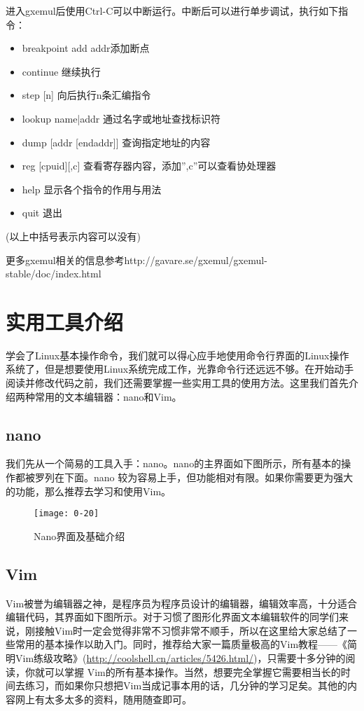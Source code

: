 进入gxemul后使用Ctrl-C可以中断运行。中断后可以进行单步调试，执行如下指令：
\begin{itemize}
\item breakpoint add addr添加断点
\item continue 继续执行
\item step [n] 向后执行n条汇编指令
\item lookup name|addr 通过名字或地址查找标识符
\item dump [addr [endaddr]] 查询指定地址的内容
\item reg [cpuid][,c] 查看寄存器内容，添加”,c”可以查看协处理器
\item help 显示各个指令的作用与用法
\item quit 退出
\end{itemize}
(以上中括号表示内容可以没有)

更多gxemul相关的信息参考http://gavare.se/gxemul/gxemul-stable/doc/index.html




\section{实用工具介绍}
学会了Linux基本操作命令，我们就可以得心应手地使用命令行界面的Linux操作系统了，但是想要使用Linux系统完成工作，光靠命令行还远远不够。在开始动手阅读并修改代码之前，我们还需要掌握一些实用工具的使用方法。这里我们首先介绍两种常用的文本编辑器：nano和Vim。
\subsection{nano}
我们先从一个简易的工具入手：nano。nano的主界面如下图所示，所有基本的操作都被罗列在下面。nano 较为容易上手，但功能相对有限。如果你需要更为强大的功能，那么推荐去学习和使用Vim。

\begin{figure}[htbp]
  \centering
  \texttt{[image: 0-20]}
  \caption{Nano界面及基础介绍}\label{fig:0-20}
\end{figure}

\subsection{Vim}
Vim被誉为编辑器之神，是程序员为程序员设计的编辑器，编辑效率高，十分适合编辑代码，其界面如下图所示。对于习惯了图形化界面文本编辑软件的同学们来说，刚接触Vim时一定会觉得非常不习惯非常不顺手，所以在这里给大家总结了一些常用的基本操作以助入门。同时，推荐给大家一篇质量极高的Vim教程——《简明Vim练级攻略》(\url{http://coolshell.cn/articles/5426.html/})，只需要十多分钟的阅读，你就可以掌握 Vim的所有基本操作。当然，想要完全掌握它需要相当长的时间去练习，而如果你只想把Vim当成记事本用的话，几分钟的学习足矣。其他的内容网上有太多太多的资料，随用随查即可。

